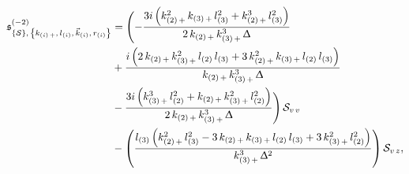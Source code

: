 \begin{equation}
  \begin{split}
    \ffs^{(-2)}_{\qty{\cS},\, \kmkrN{i}}
    & =
    \Biggl(
      -
      \frac{%
        3 i\, \qty(%
          k_{\qty(2)\, +}^2\, k_{\qty(3)\, +}\, l_{\qty(3)}^2
          +
          k_{\qty(2)\, +}^3\, l_{\qty(3)}^2
        )
      }{%
        2\, k_{\qty(2)\, +}\, k_{\qty(3)\, +}^3\, \Delta
      }
      \\
      & +
      \frac{%
        i\, \qty(%
          2\, k_{\qty(2)\, +}\, k_{\qty(3)\, +}^2\, l_{\qty(2)}\, l_{\qty(3)}
          +
          3\, k_{\qty(2)\, +}^2\, k_{\qty(3)\, +}\, l_{\qty(2)}\, l_{\qty(3)}
        )
      }{%
        k_{\qty(2)\, +}\, k_{\qty(3)\, +}^3\, \Delta
      }
      \\
      & -
      \frac{%
        3 i\, \qty(%
          k_{\qty(3)\, +}^3\, l_{\qty(2)}^2
          +
          k_{\qty(2)\, +}\, k_{\qty(3)\, +}^2\, l_{\qty(2)}^2
        )
      }{%
        2\, k_{\qty(2)\, +}\, k_{\qty(3)\, +}^3\, \Delta
      }
    \Biggr)\,
    \cS_{v\, v} 
    \\
    & -
    \qty(%
      \frac{%
        l_{\qty(3)}\,
        \qty(%
          k_{\qty(2)\, +}^2\, l_{\qty(3)}^2-3\, k_{\qty(2)\, +}\, k_{\qty(3)\, +}\, l_{\qty(2)}\, l_{\qty(3)}
          +
          3\, k_{\qty(3)\, +}^2\, l_{\qty(2)}^2
        )
      }{%
        k_{\qty(3)\, +}^3\, \Delta^2
      }
    )\,
    \cS_{v\, z},
  \end{split}
\end{equation}

